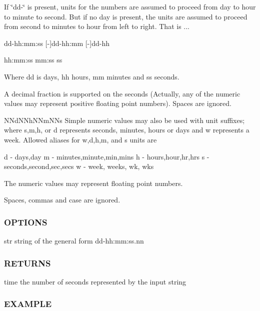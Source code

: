 If \char`\"{}dd-\/\char`\"{} is present, units for the numbers are assumed to proceed from day to hour to minute to second. But if no day is present, the units are assumed to proceed from second to minutes to hour from left to right. That is ... \begin{DoxyVerb}  [-]dd-hh:mm:ss
  [-]dd-hh:mm
  [-]dd-hh

  hh:mm:ss
  mm:ss
  ss

   Where dd is days, hh hours, mm minutes and ss seconds.

   A decimal fraction is supported on the seconds (Actually,
   any of the numeric values may represent positive floating
   point numbers). Spaces are ignored.

 NNdNNhNNmNNs
   Simple numeric values may also be used with unit suffixes; where
   s,m,h, or d represents seconds, minutes, hours or days and w
   represents a week. Allowed aliases for w,d,h,m, and s units are

                    d -  days,day
                    m -  minutes,minute,min,mins
                    h -  hours,hour,hr,hrs
                    s -  seconds,second,sec,secs
                    w -  week, weeks, wk, wks

   The numeric values may represent floating point numbers.

   Spaces, commas and case are ignored.
\end{DoxyVerb}


\subsubsection*{O\+P\+T\+I\+O\+NS}

str string of the general form dd-\/hh\+:mm\+:ss.\+nn \subsubsection*{R\+E\+T\+U\+R\+NS}

time the number of seconds represented by the input string

\subsubsection*{E\+X\+A\+M\+P\+LE}

